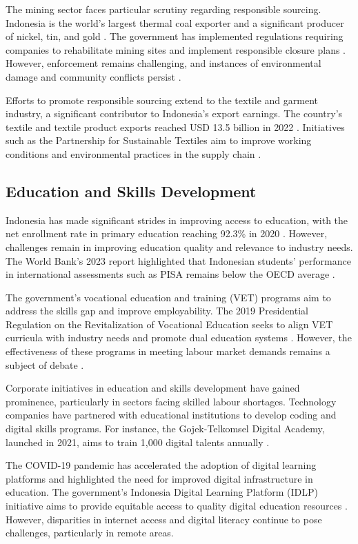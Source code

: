The mining sector faces particular scrutiny regarding responsible sourcing. Indonesia is the world's largest thermal coal exporter and a significant producer of nickel, tin, and gold \cite{BPS2023}. The government has implemented regulations requiring companies to rehabilitate mining sites and implement responsible closure plans \cite{MiningLawNo4of2009}. However, enforcement remains challenging, and instances of environmental damage and community conflicts persist \cite{MiningWatchCanada2021}.

Efforts to promote responsible sourcing extend to the textile and garment industry, a significant contributor to Indonesia's export earnings. The country's textile and textile product exports reached USD 13.5 billion in 2022 \cite{IndonesianTextileAssociation2023}. Initiatives such as the Partnership for Sustainable Textiles aim to improve working conditions and environmental practices in the supply chain \cite{PartnershipforSustainableTextiles2023}.

\subsection{Education and Skills Development}

Indonesia has made significant strides in improving access to education, with the net enrollment rate in primary education reaching 92.3\% in 2020 \cite{UNESCO2021}. However, challenges remain in improving education quality and relevance to industry needs. The World Bank's 2023 report highlighted that Indonesian students' performance in international assessments such as PISA remains below the OECD average \cite{WorldBank2023}.

The government's vocational education and training (VET) programs aim to address the skills gap and improve employability. The 2019 Presidential Regulation on the Revitalization of Vocational Education seeks to align VET curricula with industry needs and promote dual education systems \cite{PresidentialRegulationNo68of2019}. However, the effectiveness of these programs in meeting labour market demands remains a subject of debate \cite{ILO2022}.

Corporate initiatives in education and skills development have gained prominence, particularly in sectors facing skilled labour shortages. Technology companies have partnered with educational institutions to develop coding and digital skills programs. For instance, the Gojek-Telkomsel Digital Academy, launched in 2021, aims to train 1,000 digital talents annually \cite{Gojek2021}.

The COVID-19 pandemic has accelerated the adoption of digital learning platforms and highlighted the need for improved digital infrastructure in education. The government's Indonesia Digital Learning Platform (IDLP) initiative aims to provide equitable access to quality digital education resources \cite{MinistryofEducation2022}. However, disparities in internet access and digital literacy continue to pose challenges, particularly in remote areas.